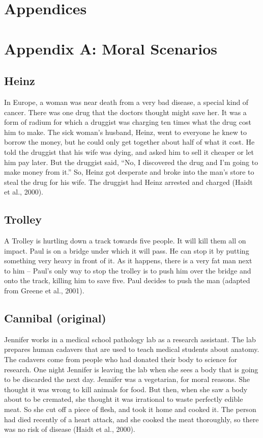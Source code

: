 \setlength{\leftskip}{0.0in}
\setlength{\parindent}{0.5in}
\clearpage
\section{Appendices}\label{appendices}

\section{Appendix A: Moral Scenarios}\label{appendix-a-moral-scenarios}

\subsection{Heinz}\label{heinz}

In Europe, a woman was near death from a very bad disease, a special
kind of cancer. There was one drug that the doctors thought might save
her. It was a form of radium for which a druggist was charging ten times
what the drug cost him to make. The sick woman's husband, Heinz, went to
everyone he knew to borrow the money, but he could only get together
about half of what it cost. He told the druggist that his wife was
dying, and asked him to sell it cheaper or let him pay later. But the
druggist said, ``No, I discovered the drug and I'm going to make money
from it.'' So, Heinz got desperate and broke into the man's store to
steal the drug for his wife. The druggist had Heinz arrested and charged
(Haidt et al., 2000).

\subsection{Trolley}\label{trolley}

A Trolley is hurtling down a track towards five people. It will kill
them all on impact. Paul is on a bridge under which it will pass. He can
stop it by putting something very heavy in front of it. As it happens,
there is a very fat man next to him -- Paul's only way to stop the
trolley is to push him over the bridge and onto the track, killing him
to save five. Paul decides to push the man (adapted from Greene et al.,
2001).

\subsection{Cannibal (original)}\label{cannibal-original}

Jennifer works in a medical school pathology lab as a research
assistant. The lab prepares human cadavers that are used to teach
medical students about anatomy. The cadavers come from people who had
donated their body to science for research. One night Jennifer is
leaving the lab when she sees a body that is going to be discarded the
next day. Jennifer was a vegetarian, for moral reasons. She thought it
was wrong to kill animals for food. But then, when she saw a body about
to be cremated, she thought it was irrational to waste perfectly edible
meat. So she cut off a piece of flesh, and took it home and cooked it.
The person had died recently of a heart attack, and she cooked the meat
thoroughly, so there was no risk of disease (Haidt et al., 2000).


